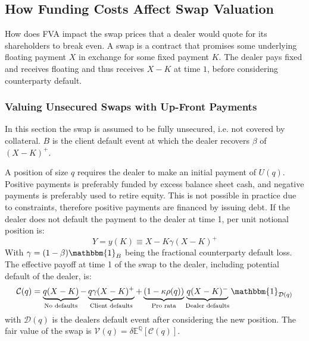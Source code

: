 \documentclass[10pt,a4paper]{article}
\begin{document}
        \subsection{How Funding Costs Affect Swap Valuation}
            How does FVA impact the swap prices that a dealer would quote for its shareholders to break even. A swap is a contract that promises some underlying floating payment $X$ in exchange for some fixed payment $K$. The dealer pays fixed and receives floating and thus receives $X-K$ at time $1$, before considering counterparty default. 

            \subsubsection{Valuing Unsecured Swaps with Up-Front Payments}
                In this section the swap is assumed to be fully unsecured, i.e. not covered by collateral. $B$ is the client default event at which the dealer recovers $\beta$ of $(X-K)^{+}$.

                A position of size $q$ requires the dealer to make an initial payment of $U(q)$. Positive payments is preferably funded by excess balance sheet cash, and negative payments is preferably used to retire equity. This is not possible in practice due to constraints, therefore positive payments are financed by issuing debt. If the dealer does not default the payment to the dealer at time 1, per unit notional position is:
                    \begin{equation}
                        Y = y(K) \equiv X - K \gamma (X-K)^{+}
                    \end{equation}
                With $\gamma=(1-\beta)\mathbbm{1}_{B}$ being the fractional counterparty default loss. The effective payoff at time 1 of the swap to the dealer, including potential default of the dealer, is:
                    \begin{equation}
                        \mathcal{C}(q) 
                            = \underbrace{q(X-K)}_{\text{No defaults}}
                            - \underbrace{q\gamma(X-K)^{+}}_{\text{Client defaults}}
                            + \underbrace{(1-\kappa\rho(q))}_{\text{Pro rata}}
                            \underbrace{q(X-K)^{-}}_{\text{Dealer defaults}}
                            \mathbbm{1}_{\mathcal{D}(q)}
                    \end{equation}
                with $\mathcal{D}(q)$ is the dealers default event after considering the new position. The fair value of the swap is $\mathcal{V}(q) = \delta \mathbb{E}^{\mathbb{Q}}\left[\mathcal{C}(q)\right] $.
\end{document}
